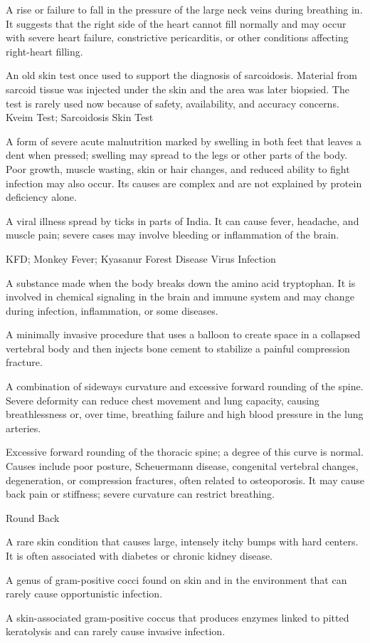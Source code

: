  A rise or failure to fall in the pressure of the large neck veins during breathing in. It suggests that the right side of the heart cannot fill normally and may occur with severe heart failure, constrictive pericarditis, or other conditions affecting right-heart filling.

 An old skin test once used to support the diagnosis of sarcoidosis. Material from sarcoid tissue was injected under the skin and the area was later biopsied. The test is rarely used now because of safety, availability, and accuracy concerns.
\synonyms
Kveim Test; Sarcoidosis Skin Test

 A form of severe acute malnutrition marked by swelling in both feet that leaves a dent when pressed; swelling may spread to the legs or other parts of the body. Poor growth, muscle wasting, skin or hair changes, and reduced ability to fight infection may also occur. Its causes are complex and are not explained by protein deficiency alone.

 A viral illness spread by ticks in parts of India. It can cause fever, headache, and muscle pain; severe cases may involve bleeding or inflammation of the brain.

\synonyms
KFD; Monkey Fever; Kyasanur Forest Disease Virus Infection

 A substance made when the body breaks down the amino acid tryptophan. It is involved in chemical signaling in the brain and immune system and may change during infection, inflammation, or some diseases.

 A minimally invasive procedure that uses a balloon to create space in a collapsed vertebral body and then injects bone cement to stabilize a painful compression fracture.

 A combination of sideways curvature and excessive forward rounding of the spine. Severe deformity can reduce chest movement and lung capacity, causing breathlessness or, over time, breathing failure and high blood pressure in the lung arteries.

 Excessive forward rounding of the thoracic spine; a degree of this
curve is normal. Causes include poor posture, Scheuermann disease, congenital vertebral
changes, degeneration, or compression fractures, often related to osteoporosis. It may
cause back pain or stiffness; severe curvature can restrict breathing.

\synonyms
Round Back

 A rare skin condition that causes large, intensely itchy bumps with hard centers. It is often associated with diabetes or chronic kidney disease.

 A genus of gram-positive cocci found on skin and in the environment that can rarely cause opportunistic infection.

 A skin-associated gram-positive coccus that produces enzymes linked to pitted keratolysis and can rarely cause invasive infection.
